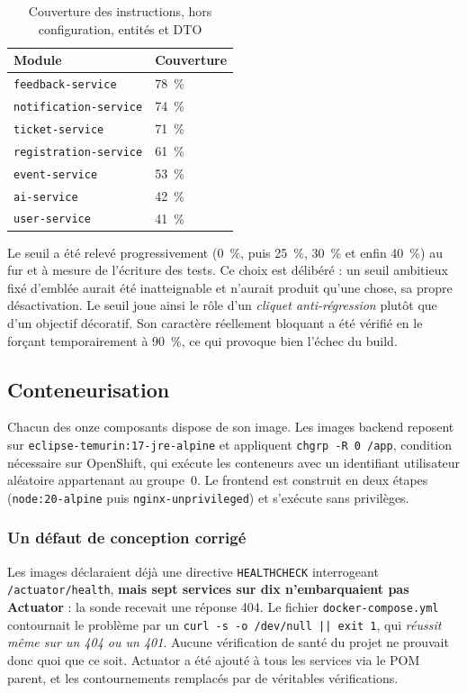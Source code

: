 \begin{table}[H]\centering\renewcommand{\arraystretch}{1.25}
\begin{tabular}{|p{5.5cm}|p{3cm}|}\hline
\rowcolor{gray!15}\textbf{Module} & \textbf{Couverture} \\ \hline
\texttt{feedback-service} & 78~\% \\ \hline
\texttt{notification-service} & 74~\% \\ \hline
\texttt{ticket-service} & 71~\% \\ \hline
\texttt{registration-service} & 61~\% \\ \hline
\texttt{event-service} & 53~\% \\ \hline
\texttt{ai-service} & 42~\% \\ \hline
\texttt{user-service} & 41~\% \\ \hline
\end{tabular}
\caption{Couverture des instructions, hors configuration, entités et DTO}\label{tab:couverture}
\end{table}

Le seuil a été relevé progressivement (0~\%, puis 25~\%, 30~\% et enfin 40~\%) au fur et à
mesure de l'écriture des tests. Ce choix est délibéré : un seuil ambitieux fixé d'emblée
aurait été inatteignable et n'aurait produit qu'une chose, sa propre désactivation. Le
seuil joue ainsi le rôle d'un \emph{cliquet anti-régression} plutôt que d'un objectif
décoratif. Son caractère réellement bloquant a été vérifié en le forçant temporairement à
90~\%, ce qui provoque bien l'échec du build.

\subsection{Conteneurisation}

Chacun des onze composants dispose de son image. Les images backend reposent sur
\texttt{eclipse-temurin:17-jre-alpine} et appliquent \texttt{chgrp -R 0 /app}, condition
nécessaire sur OpenShift, qui exécute les conteneurs avec un identifiant utilisateur
aléatoire appartenant au groupe~0. Le frontend est construit en deux étapes
(\texttt{node:20-alpine} puis \texttt{nginx-unprivileged}) et s'exécute sans privilèges.

\subsubsection{Un défaut de conception corrigé}
Les images déclaraient déjà une directive \texttt{HEALTHCHECK} interrogeant
\texttt{/actuator/health}, \textbf{mais sept services sur dix n'embarquaient pas Actuator} :
la sonde recevait une réponse 404. Le fichier \texttt{docker-compose.yml} contournait le
problème par un \texttt{curl -s -o /dev/null || exit 1}, qui \emph{réussit même sur un 404
ou un 401}. Aucune vérification de santé du projet ne prouvait donc quoi que ce soit.
Actuator a été ajouté à tous les services via le POM parent, et les contournements
remplacés par de véritables vérifications.

